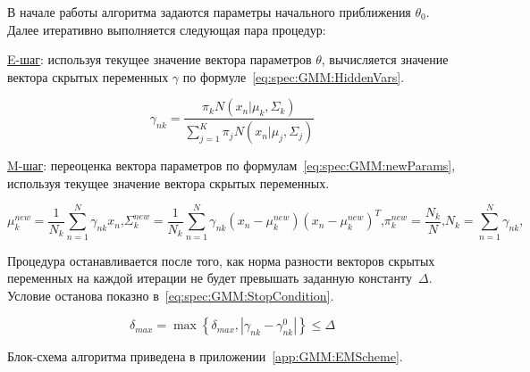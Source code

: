 В начале работы алгоритма задаются параметры начального приближения $\theta_0$. Далее итеративно выполняется следующая пара процедур:

\uline{E-шаг}: используя текущее значение вектора параметров $\theta$, вычисляется значение вектора скрытых переменных $\gamma$ по формуле~\eqref{eq:spec:GMM:HiddenVars}.

\begin{equation} \label{eq:spec:GMM:HiddenVars}
\gamma_{nk} = \frac{\pi_k N(x_n|\mu_k,\Sigma_k)}{\sum_{j=1}^{K} \pi_j N(x_n|\mu_j,\Sigma_j)}
\end{equation}

\uline{M-шаг}: переоценка вектора параметров по формулам~\eqref{eq:spec:GMM:newParams}, используя текущее значение вектора скрытых переменных.

\begin{subequations} \label{eq:spec:GMM:newParams}
\begin{equation} %
\mu_k^{new} = \frac{1}{N_k} \sum_{n=1}^{N} \gamma_{nk} x_n \text{,}
\end{equation}
\begin{equation} %
\Sigma_k^{new} = \frac{1}{N_k} \sum_{n=1}^{N} \gamma_{nk} (x_n - \mu_k^{new})(x_n-\mu_k^{new})^T \text{,}
\end{equation}
\begin{equation} %
\pi_k^{new} = \frac{N_k}{N} \text{,}
\end{equation}
\begin{equation} %
N_k = \sum_{n=1}^{N} \gamma_{nk} \text{,}
\end{equation}
\end{subequations}

Процедура останавливается после того, как норма разности векторов скрытых переменных на каждой итерации не будет превышать заданную константу~$\Delta$. Условие останова показно в~\eqref{eq:spec:GMM:StopCondition}.

\begin{equation} \label{eq:spec:GMM:StopCondition}
\delta_{max} = \max \left\{\delta_{max},|\gamma_{nk} - \gamma_{nk}^0|\right\} \leq\Delta
\end{equation}

Блок-схема алгоритма приведена в приложении~\ref{app:GMM:EMScheme}.